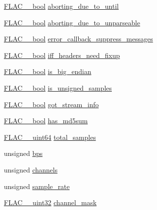 \begin{DoxyCompactItemize}
\item 
\hyperlink{ordinals_8h_a95103469f1cbd78b8cf250194985b34e}{F\+L\+A\+C\+\_\+\+\_\+bool} \hyperlink{struct_decoder_session_a49d6dfa8af2fdea84d807c388082df7a}{aborting\+\_\+due\+\_\+to\+\_\+until}
\item 
\hyperlink{ordinals_8h_a95103469f1cbd78b8cf250194985b34e}{F\+L\+A\+C\+\_\+\+\_\+bool} \hyperlink{struct_decoder_session_ae0455203170ffffc3d698183f0fac3d6}{aborting\+\_\+due\+\_\+to\+\_\+unparseable}
\item 
\hyperlink{ordinals_8h_a95103469f1cbd78b8cf250194985b34e}{F\+L\+A\+C\+\_\+\+\_\+bool} \hyperlink{struct_decoder_session_a0451e80ad7412cd846c734023b5c9012}{error\+\_\+callback\+\_\+suppress\+\_\+messages}
\item 
\hyperlink{ordinals_8h_a95103469f1cbd78b8cf250194985b34e}{F\+L\+A\+C\+\_\+\+\_\+bool} \hyperlink{struct_decoder_session_a4b52a30b9774fc7b7f1dac07af6741a0}{iff\+\_\+headers\+\_\+need\+\_\+fixup}
\item 
\hyperlink{ordinals_8h_a95103469f1cbd78b8cf250194985b34e}{F\+L\+A\+C\+\_\+\+\_\+bool} \hyperlink{struct_decoder_session_a1ea442ba13580b691734705d94d44a3b}{is\+\_\+big\+\_\+endian}
\item 
\hyperlink{ordinals_8h_a95103469f1cbd78b8cf250194985b34e}{F\+L\+A\+C\+\_\+\+\_\+bool} \hyperlink{struct_decoder_session_a617094acdae08080a7d95a8efc1ba898}{is\+\_\+unsigned\+\_\+samples}
\item 
\hyperlink{ordinals_8h_a95103469f1cbd78b8cf250194985b34e}{F\+L\+A\+C\+\_\+\+\_\+bool} \hyperlink{struct_decoder_session_a5cd16e290c22282106c647ac1d0dc8ca}{got\+\_\+stream\+\_\+info}
\item 
\hyperlink{ordinals_8h_a95103469f1cbd78b8cf250194985b34e}{F\+L\+A\+C\+\_\+\+\_\+bool} \hyperlink{struct_decoder_session_a170ff40c257b7503511652e7fa8c7e58}{has\+\_\+md5sum}
\item 
\hyperlink{ordinals_8h_aa78c8c70a3eb8a58af7436f278acde8e}{F\+L\+A\+C\+\_\+\+\_\+uint64} \hyperlink{struct_decoder_session_af94ccd024ddf286bf808930cdde049da}{total\+\_\+samples}
\item 
unsigned \hyperlink{struct_decoder_session_a8e4a5731c49edf1b4b51d138d02a0ad9}{bps}
\item 
unsigned \hyperlink{struct_decoder_session_abf085096b41983eff38f0b73befb37e0}{channels}
\item 
unsigned \hyperlink{struct_decoder_session_a4703f569cd6deba3a8469b97a272392e}{sample\+\_\+rate}
\item 
\hyperlink{ordinals_8h_a9c4005ea7ef8d564b0cc993cdd0e4e5e}{F\+L\+A\+C\+\_\+\+\_\+uint32} \hyperlink{struct_decoder_session_a5fbdf1cdf09d83b3e9b9496c38816ac0}{channel\+\_\+mask}

\end{DoxyCompactItemize}

